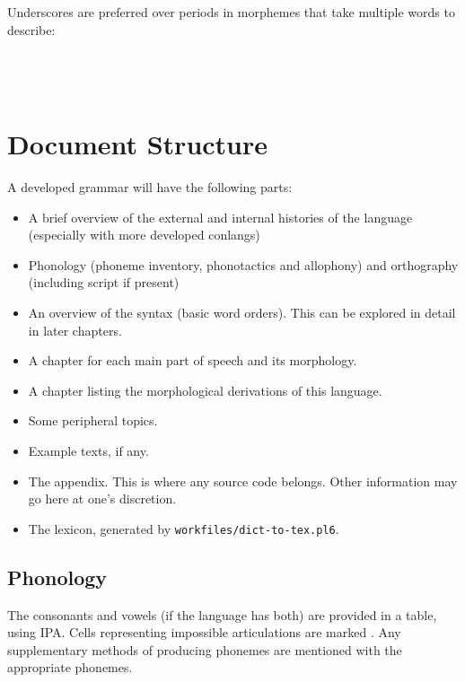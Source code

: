 \documentclass{book}
\begin{document}
Underscores are preferred over periods in morphemes that take multiple words to describe:
~\\
 \\
       \hlviii{$>$} \\
      \\

\chapter{Document Structure}

A developed grammar will have the following parts:

\begin{itemize}
  \item A brief overview of the external and internal histories of the language (especially with more developed conlangs)
  \item Phonology (phoneme inventory, phonotactics and allophony) and orthography (including script if present)
  \item An overview of the syntax (basic word orders). This can be explored in detail in later chapters.
  \item A chapter for each main part of speech and its morphology.
  \item A chapter listing the morphological derivations of this language.
  \item Some peripheral topics.
  \item Example texts, if any.
  \item The appendix. This is where any source code belongs. Other information may go here at one's discretion.
  \item The lexicon, generated by \texttt{workfiles/dict-to-tex.pl6}.
\end{itemize}

\section{Phonology}

The consonants and vowels (if the language has both) are provided in a table, using IPA. Cells representing impossible articulations are marked \texttt{}. Any supplementary methods of producing phonemes are mentioned with the appropriate phonemes.
\end{document}
